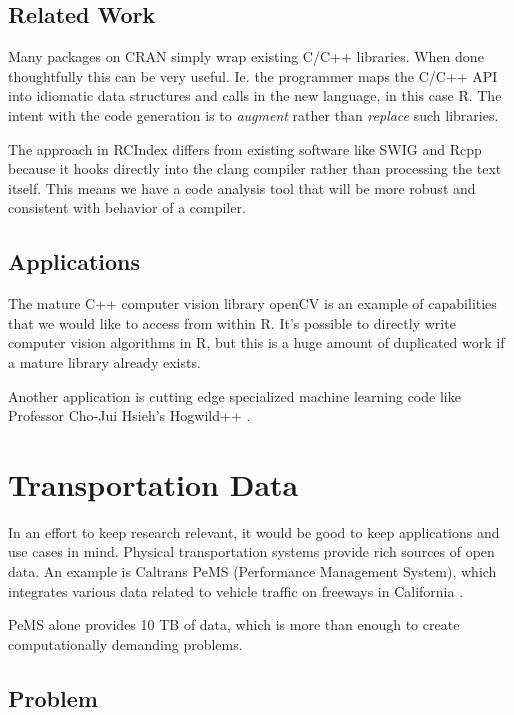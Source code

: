 \documentclass[12pt]{article}
\begin{document}
\subsection{Related Work}

Many packages on CRAN simply wrap existing C/C++ libraries. When done
thoughtfully this can be very useful. Ie. the programmer maps the C/C++ API
into idiomatic data structures and calls in the new language, in this case
R. 
The intent with the code generation is to \emph{augment} rather than
\emph{replace} such libraries. 

The approach in RCIndex differs from existing software like SWIG
\cite{swig} and Rcpp \cite{R-Rcpp} because it hooks directly into the clang
compiler rather than processing the text itself. This means we have a code
analysis tool that will be more robust and consistent with behavior of a compiler. 



\subsection{Applications}

The mature C++ computer vision library openCV
\cite{opencv_library} is an example of capabilities that we would like to
access from within R. It's possible to directly write computer vision
algorithms in R, but this is a huge amount of duplicated work if a mature
library already exists.

Another application is cutting edge specialized machine learning code like
Professor Cho-Jui Hsieh's Hogwild++ \cite{zhang2016hogwild}.


\section{Transportation Data}

In an effort to keep research relevant, it would be good to keep
applications and use cases in mind. Physical transportation systems provide
rich sources of open data. An example is Caltrans PeMS (Performance
Management System), which integrates various data related to vehicle
traffic on freeways in California \cite{jia2001pems}.

PeMS alone provides 10 TB of data, which is more than enough to create
computationally demanding problems.

\subsection{Problem}
\end{document}
